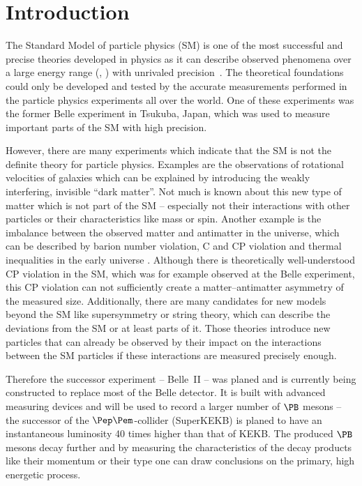 \chapter{Introduction}

The Standard Model of particle physics (SM) is one of the most successful and precise theories developed in physics as it can describe observed phenomena over a large energy range (\cite{omg}, \cite{hydrogen}) with unrivaled precision~\cite{mu}. The theoretical foundations could only be developed and tested by the accurate measurements performed in the particle physics experiments all over the world. One of these experiments was the former Belle experiment in Tsukuba, Japan, which was used to measure important parts of the SM with high precision. 

However, there are many experiments which indicate that the SM is not the definite theory for particle physics. Examples are the observations of rotational velocities of galaxies \cite{galaxy} which can be explained by introducing the weakly interfering, invisible ``dark matter''. Not much is known about this new type of matter which is not part of the SM -- especially not their interactions with other particles or their characteristics like mass or spin. Another example is the imbalance between the observed matter and antimatter in the universe, which can be described by barion number violation, C and CP violation and thermal inequalities in the early universe \cite{sakharov}. Although there is theoretically well-understood CP violation in the SM, which was for example observed at the Belle experiment, this CP violation can not sufficiently create a matter--antimatter asymmetry of the measured size. Additionally, there are many candidates for new models beyond the SM like supersymmetry or string theory, which can describe the deviations from the SM or at least parts of it. Those theories introduce new particles that can already be observed by their impact on the interactions between the SM particles if these interactions are measured precisely enough.

Therefore the successor experiment -- Belle~II -- was planed and is currently being constructed to replace most of the Belle detector. It is built with advanced measuring devices and will be used to record a larger number of $\PB$ mesons -- the successor of the $\Pep\Pem$-collider (SuperKEKB) is planed to have an instantaneous luminosity 40 times higher than that of KEKB. The produced $\PB$ mesons decay further and by measuring the characteristics of the decay products like their momentum or their type one can draw conclusions on the primary, high energetic process.

